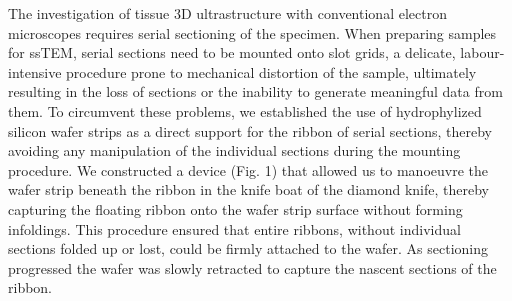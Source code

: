 \documentclass{article}
\begin{document}
The investigation of tissue 3D ultrastructure with conventional electron microscopes requires serial sectioning of the specimen. When preparing samples for ssTEM, serial sections need to be mounted onto slot grids, a delicate, labour-intensive procedure prone to mechanical distortion of the sample, ultimately resulting in the loss of sections or the inability to generate meaningful data from them. To circumvent these problems, we established the use of hydrophylized silicon wafer strips as a direct support for the ribbon of serial sections, thereby avoiding any manipulation of the individual sections during the mounting procedure. We constructed a device (Fig. 1) that allowed us to manoeuvre the wafer strip beneath the ribbon in the knife boat of the diamond knife, thereby capturing the floating ribbon onto the wafer strip surface without forming infoldings. This procedure ensured that entire ribbons, without individual sections folded up or lost, could be firmly attached to the wafer. As sectioning progressed the wafer was slowly retracted to capture the nascent sections of the ribbon.
\end{document}
